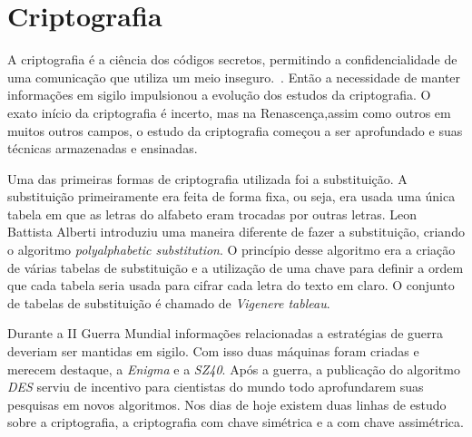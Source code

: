 \chapter{Criptografia}
\label{cryptograhy}

%
A criptografia é a ciência dos códigos secretos, permitindo a confidencialidade de uma comunicação que utiliza um meio inseguro.~\cite{vauldenay}. Então a necessidade de manter informações em sigilo impulsionou a evolução dos estudos da criptografia. O exato início da criptografia é incerto, mas na Renascença,assim como outros em muitos outros campos, o estudo da criptografia começou a ser aprofundado e suas técnicas armazenadas e ensinadas. ~\cite{donald-davies}

%
Uma das primeiras formas de criptografia utilizada foi a substituição. A substituição primeiramente era feita de forma fixa, ou seja, era usada uma única tabela em que as letras do alfabeto eram trocadas por outras letras. Leon Battista Alberti introduziu uma maneira diferente de fazer a substituição, criando o algoritmo \textit{polyalphabetic substitution}. O princípio desse algoritmo era a criação de várias tabelas de substituição e a utilização de uma chave para definir a ordem que cada tabela seria usada para cifrar cada letra do texto em claro. O conjunto de tabelas de substituição é chamado de \textit{Vigenere tableau}.

%
Durante a II Guerra Mundial informações relacionadas a estratégias de guerra deveriam ser mantidas em sigilo. Com isso duas máquinas foram criadas e merecem destaque, a \textit{Enigma} e a \textit{SZ40}. Após a guerra, a publicação do algoritmo \textit{DES} serviu de incentivo para cientistas do mundo todo aprofundarem suas pesquisas em novos algoritmos. Nos dias de hoje existem duas linhas de estudo sobre a criptografia, a criptografia com chave simétrica e a com chave assimétrica. 

